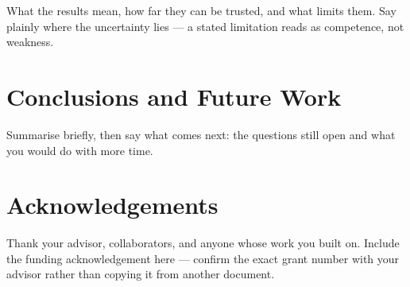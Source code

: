 \documentclass{coereu} %
\begin{document}
What the results mean, how far they can be trusted, and what limits them.
Say plainly where the uncertainty lies --- a stated limitation reads as
competence, not weakness.

\section{Conclusions and Future Work}\label{sec:conclusions}

Summarise briefly, then say what comes next: the questions still open and
what you would do with more time.

\section{Acknowledgements}\label{sec:ack}

Thank your advisor, collaborators, and anyone whose work you built on.
Include the funding acknowledgement here --- confirm the exact grant
number with your advisor rather than copying it from another document.
\end{document}
